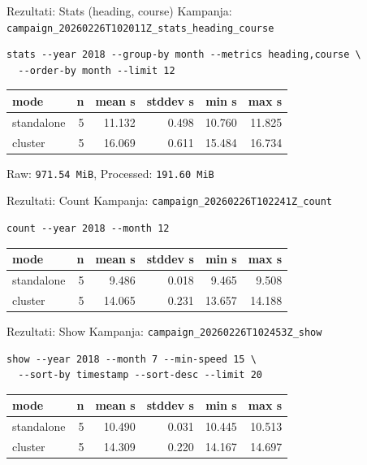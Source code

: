 \documentclass[aspectratio=169,11pt]{beamer}
\newcommand{\code}[1]{\texttt{\small #1}}
\begin{document}
\begin{frame}[fragile]{Rezultati: Stats (heading, course)}
  Kampanja: \code{campaign\_20260226T102011Z\_stats\_heading\_course}

  \scriptsize
  \begin{verbatim}
stats --year 2018 --group-by month --metrics heading,course \
  --order-by month --limit 12
  \end{verbatim}
  \normalsize

  \begin{tabular}{lrrrrr}
    \toprule
    mode & n & mean s & stddev s & min s & max s \\
    \midrule
    standalone & 5 & 11.132 & 0.498 & 10.760 & 11.825 \\
    cluster & 5 & 16.069 & 0.611 & 15.484 & 16.734 \\
    \bottomrule
  \end{tabular}

  \vspace{0.25cm}
  Raw: \code{971.54 MiB}, Processed: \code{191.60 MiB}
\end{frame}

\begin{frame}[fragile]{Rezultati: Count}
  Kampanja: \code{campaign\_20260226T102241Z\_count}

  \begin{verbatim}
count --year 2018 --month 12
  \end{verbatim}

  \begin{tabular}{lrrrrr}
    \toprule
    mode & n & mean s & stddev s & min s & max s \\
    \midrule
    standalone & 5 & 9.486 & 0.018 & 9.465 & 9.508 \\
    cluster & 5 & 14.065 & 0.231 & 13.657 & 14.188 \\
    \bottomrule
  \end{tabular}
\end{frame}

\begin{frame}[fragile]{Rezultati: Show}
  Kampanja: \code{campaign\_20260226T102453Z\_show}

  \scriptsize
  \begin{verbatim}
show --year 2018 --month 7 --min-speed 15 \
  --sort-by timestamp --sort-desc --limit 20
  \end{verbatim}
  \normalsize

  \begin{tabular}{lrrrrr}
    \toprule
    mode & n & mean s & stddev s & min s & max s \\
    \midrule
    standalone & 5 & 10.490 & 0.031 & 10.445 & 10.513 \\
    cluster & 5 & 14.309 & 0.220 & 14.167 & 14.697 \\
    \bottomrule
  \end{tabular}
\end{frame}
\end{document}
